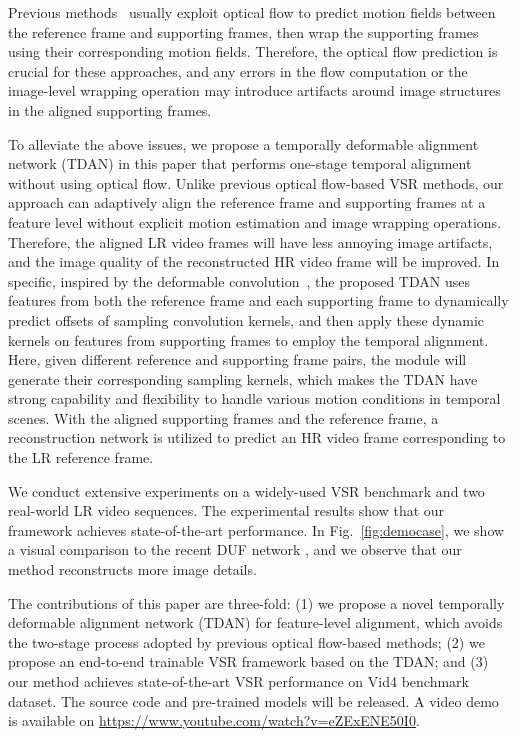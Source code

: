 \documentclass[10pt,twocolumn,letterpaper]{article}
\begin{document}
Previous methods~\cite{caballero2017real,liu2017robust,tao2017detail,xue2017video,sajjadi2018frame} usually exploit optical flow to predict motion fields between the reference frame and supporting frames, then wrap the supporting frames using their corresponding motion fields. Therefore, the optical flow prediction is crucial for these approaches, and any errors in the flow computation or the image-level wrapping operation may introduce artifacts around image structures in the aligned supporting frames.

To alleviate the above issues, we propose a temporally deformable alignment network (TDAN) in this paper that performs one-stage temporal alignment without using optical flow. Unlike previous optical flow-based VSR methods, our approach can adaptively align the reference frame and supporting frames at a feature level without explicit motion estimation and image wrapping operations. Therefore, the aligned LR video frames will have less annoying image artifacts, and the image quality of the reconstructed HR video frame will be improved. In specific, inspired by the deformable convolution~\cite{Dai_2017_ICCV}, the proposed TDAN uses features from both the reference frame and each supporting frame to dynamically predict offsets of sampling convolution kernels, and then apply these dynamic kernels on features from supporting frames to employ the temporal alignment. Here, given different reference and supporting frame pairs, the module will generate their corresponding sampling kernels, which makes the TDAN have strong capability and flexibility to handle various motion conditions in temporal scenes. With the aligned supporting frames and the reference frame, a reconstruction network is utilized to predict an HR video frame corresponding to the LR reference frame.

We conduct extensive experiments on a widely-used VSR benchmark and two real-world LR video sequences. The experimental results show that our framework achieves state-of-the-art performance. In Fig.~\ref{fig:democase}, we show a visual comparison to the recent DUF network \cite{jo2018deep}, and we observe that our method reconstructs more image details.

The contributions of this paper are three-fold: (1) we propose a novel temporally deformable alignment network (TDAN) for feature-level alignment, which avoids the two-stage process adopted by previous optical flow-based methods;
(2) we propose an end-to-end trainable VSR framework based on the TDAN; and (3) our method achieves state-of-the-art VSR performance on Vid4 \cite{liu2014bayesian} benchmark dataset. The source code and pre-trained models will be released. A video demo is available on \textcolor{magenta}{\url{https://www.youtube.com/watch?v=eZExENE50I0}}.
\end{document}
